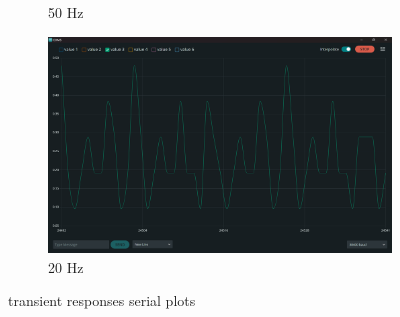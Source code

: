 \documentclass[12pt]{article}
\begin{document}
\begin{figure}[h]
\begin{subfigure}{.49\textwidth}
		\caption{50 Hz}
    \end{subfigure}
    \begin{subfigure}{.49\textwidth}
        \centering
        \includegraphics[width=0.95\linewidth]{images/q4/20Hz.png} 
		\caption{20 Hz}
    \end{subfigure}
    \caption{transient responses serial plots}
\end{figure}
\end{document}
